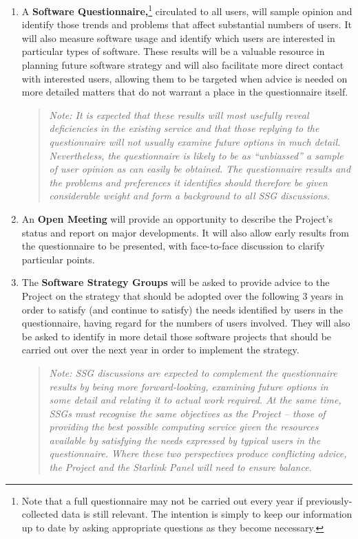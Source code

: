 \documentclass[twoside,11pt]{article}
\newcommand{\st}[1]{{\em{#1}}}
\newcommand{\qt}[1]{``#1''}
\newcommand{\qt}[1]{{\tt{"}}#1{\tt{"}}}
\begin{document}
\begin{enumerate}
\item A {\bf Software Questionnaire,}\footnote{Note that a full
questionnaire may not be carried out every year if
previously-collected data is still relevant. The intention is simply
to keep our information up to date by asking appropriate questions as
they become necessary.}  circulated to all users, will sample opinion
and identify those trends and problems that affect substantial numbers
of users.  It will also measure software usage and identify which
users are interested in particular types of software. These results
will be a valuable resource in planning future software strategy and
will also facilitate more direct contact with interested users,
allowing them to be targeted when advice is needed on more detailed
matters that do not warrant a place in the questionnaire itself.

\begin{quote}
\st{Note: It is expected that these results will most usefully reveal
deficiencies in the existing service and that those replying to the
questionnaire will not usually examine future options in much
detail. Nevertheless, the questionnaire is likely to be as
\qt{unbiassed} a sample of user opinion as can easily be obtained. The
questionnaire results and the problems and preferences it identifies
should therefore be given considerable weight and form a background to
all SSG discussions.}
\end{quote}

\item An {\bf Open Meeting} will provide an opportunity to
describe the Project's status and report on major developments. It
will also allow early results from the questionnaire to be presented,
with face-to-face discussion to clarify particular points.

\item The {\bf Software Strategy Groups} will be asked to provide
advice to the Project on the strategy that should be adopted over the
following 3 years in order to satisfy (and continue to satisfy) the
needs identified by users in the questionnaire, having regard for the
numbers of users involved. They will also be asked to identify in more
detail those software projects that should be carried out over the
next year in order to implement the strategy.

\begin{quote}
\st{Note: SSG discussions are expected to complement the questionnaire
results by being more forward-looking, examining future options in
some detail and relating it to actual work required. At the same time,
SSGs must recognise the same objectives as the Project -- those of
providing the best possible computing service given the resources
available by satisfying the needs expressed by typical users in the
questionnaire. Where these two perspectives produce conflicting
advice, the Project and the Starlink Panel will need to ensure
balance.}
\end{quote}


\end{enumerate}
\end{document}
